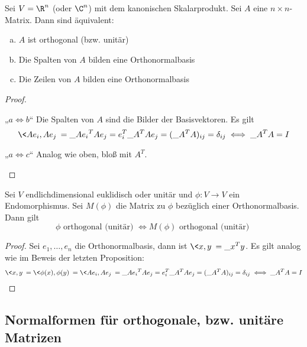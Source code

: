 \documentclass[a4paper, 10pt]{scrbook}
\begin{document}
\begin{prop}
	\label{prop:13.18}
	Sei $V = \R^n$ (oder $\C^n$) mit dem kanonischen Skalarprodukt.
	Sei $A$ eine $n\times n$-Matrix.
	Dann sind äquivalent:
	\begin{enumerate}[(a)]
		\item
			$A$ ist orthogonal (bzw. unitär)
		\item
			Die Spalten von $A$ bilden eine Orthonormalbasis
		\item
			Die Zeilen von $A$ bilden eine Orthonormalbasis
	\end{enumerate}
	\begin{proof}~
		\begin{seg}{„$a \iff b$“}
			Die Spalten von $A$ sind die Bilder der Basisvektoren.
			Es gilt
			\[
				\<Ae_i,Ae_j\> = \_{Ae_i}^TAe_j = e_i^T\_A^TAe_j = (\_A^TA)_{ij} = \delta_{ij} \iff \_A^TA = I
			\]
		\end{seg}
		\begin{seg}{„$a \iff c$“}
			Analog wie oben, bloß mit $A^T$.
		\end{seg}
	\end{proof}
\end{prop}

\begin{prop}
	\label{prop:13.19}
	Sei $V$ endlichdimensional euklidisch oder unitär und $\phi:V\to V$ ein Endomorphismus.
	Sei $M(\phi)$ die Matrix zu $\phi$ bezüglich einer Orthonormalbasis.
	Dann gilt
	\[
		\phi \text{ orthogonal (unitär) } \iff M(\phi) \text{ orthogonal (unitär) }
	\]
	\begin{proof}
		Sei $e_1,\dotsc, e_n$ die Orthonormalbasis, dann ist $\<x,y\>=\_x^Ty$.
		Es gilt analog wie im Beweis der letzten Proposition:
		\begin{align*}
			\<x,y\> = \<\phi(x),\phi(y)\> = \<Ae_i,Ae_j\> = \_{Ae_i}^TAe_j = e_i^T\_A^TAe_j = (\_A^TA)_{ij} = \delta_{ij} \iff \_A^TA = I
		\end{align*}
	\end{proof}
\end{prop}

\subsection{Normalformen für orthogonale, bzw. unitäre Matrizen}
\end{document}
